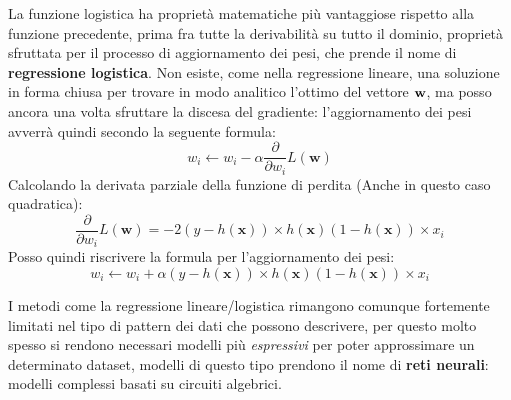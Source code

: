 \documentclass[../../main.tex]{subfiles}
\begin{document}
    La funzione logistica ha proprietà matematiche più vantaggiose rispetto alla funzione precedente, prima fra tutte la derivabilità su tutto il dominio, proprietà sfruttata per il processo di aggiornamento dei pesi, che prende il nome di \textbf{regressione logistica}. Non esiste, come nella regressione lineare, una soluzione in forma chiusa per trovare in modo analitico l'ottimo del vettore $\bf{w}$, ma posso ancora una volta sfruttare la discesa del gradiente: l'aggiornamento dei pesi avverrà quindi secondo la seguente formula:
    \[w_i \leftarrow w_i - \alpha \frac{\partial}{\partial w_i} L(\boldsymbol{w})\]
    Calcolando la derivata parziale della funzione di perdita (Anche in questo caso quadratica):
    \[\frac{\partial}{\partial w_i} L(\boldsymbol{w}) = -2 (y - h(\boldsymbol{x})) \times h(\boldsymbol{x})(1 - h(\boldsymbol{x})) \times x_i\]
    Posso quindi riscrivere la formula per l'aggiornamento dei pesi:
    \[w_i \leftarrow w_i + \alpha (y - h(\boldsymbol{x})) \times h(\boldsymbol{x})(1 - h(\boldsymbol{x})) \times x_i\]

    I metodi come la regressione lineare/logistica rimangono comunque fortemente limitati nel tipo di pattern dei dati che possono descrivere, per questo molto spesso si rendono necessari modelli più \textit{espressivi} per  poter approssimare un determinato dataset, modelli di questo tipo prendono il nome di \textbf{reti neurali}: modelli complessi basati su circuiti algebrici.
\end{document}
